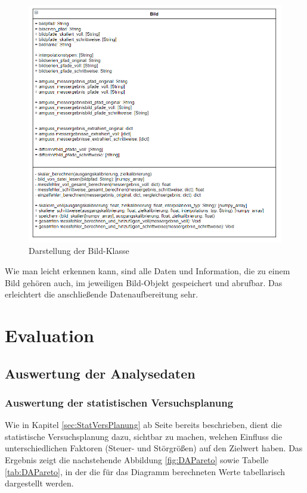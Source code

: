 \documentclass[
fontsize=10pt, 
listof = totoc,
parskip = half	
]{report}
\begin{document}
\begin{figure}[H]
	\centering
	\includegraphics[width=\textwidth, height=\textheight, keepaspectratio]{pics/class_image}
	\caption{Darstellung der Bild-Klasse}
	\label{fig:KlasseBild}
\end{figure}

\noindent Wie man leicht erkennen kann, sind alle Daten und Information, die zu einem Bild gehören auch, im jeweiligen Bild-Objekt gespeichert und abrufbar. Das erleichtert die anschließende Datenaufbereitung sehr.


\chapter{Evaluation}
\label{ch:Evaluation}

\section{Auswertung der Analysedaten}
\label{sec:AuswertungAnalysedaten}

\subsection{Auswertung der statistischen Versuchsplanung}
\label{subsubsec:AuswertungStatVpl}
Wie in Kapitel \ref{sec:StatVersPlanung} ab Seite \pageref{sec:StatVersPlanung} bereits beschrieben, dient die statistische Versuchsplanung dazu, sichtbar zu machen, welchen Einfluss die unterschiedlichen Faktoren (Steuer- und Störgrößen) auf den Zielwert haben. Das Ergebnis zeigt die nachstehende Abbildung \ref{fig:DAPareto} sowie Tabelle \ref{tab:DAPareto}, in der die für das Diagramm berechneten Werte tabellarisch dargestellt werden. 
\end{document}

